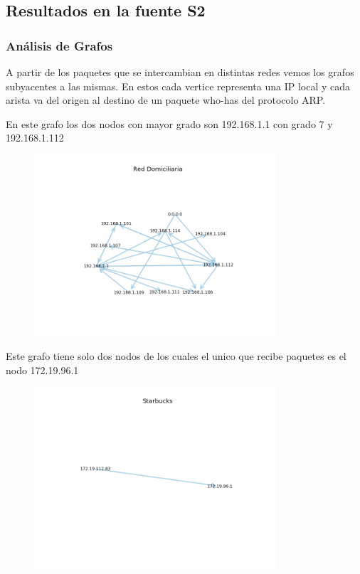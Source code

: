 \subsection{Resultados en la fuente S2}

\subsubsection{Análisis de Grafos}

A partir de los paquetes que se intercambian en distintas redes vemos los grafos subyacentes a las mismas. En estos cada vertice representa una IP local y cada arista va del origen al destino de un paquete who-has del protocolo ARP.


En este grafo los dos nodos con mayor grado son 192.168.1.1 con grado 7 y 192.168.1.112

\begin{figure}[H]
 \centering
	\includegraphics[width=0.8\textwidth]{figs/red_domiciliaria.png}
	\caption{}
	\label{fig:starbucks-grafo}
\end{figure}


Este grafo tiene solo dos nodos de los cuales el unico que recibe paquetes es el nodo 172.19.96.1

\begin{figure}[H]
 \centering
	\includegraphics[width=0.8\textwidth]{figs/starbucks.png}
	\caption{}
	\label{fig:domicilio-grafo}
\end{figure}


